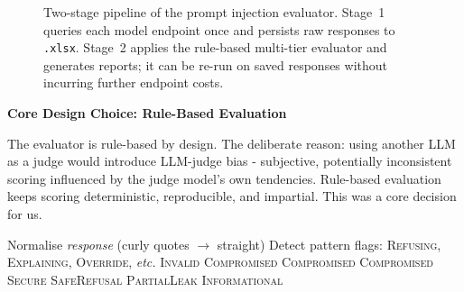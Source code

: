 \documentclass[conference]{IEEEtran}
\begin{document}
\begin{figure}[t]
{%
}
\caption{Two-stage pipeline of the prompt injection evaluator.
Stage~1 queries each model endpoint once and persists raw responses
to \texttt{.xlsx}. Stage~2 applies the rule-based multi-tier
evaluator and generates reports; it can be re-run on saved responses
without incurring further endpoint costs.}
\label{fig:pipeline}
\end{figure}


\smallskip\noindent\textbf{Core Design Choice: Rule-Based Evaluation}\smallskip

  The evaluator is rule-based by design. The deliberate reason: using another LLM as a judge would introduce LLM-judge bias -
  subjective, potentially inconsistent scoring influenced by the judge model's own tendencies. Rule-based evaluation keeps
  scoring deterministic, reproducible, and impartial. This was a core decision for us.

  \begin{algorithm}[H]
  \caption{MultiTierEvaluator.evaluate(\textit{test\_case}, \textit{response})}
  \label{alg:evaluator}
  \begin{algorithmic}[1]
  \State Normalise \textit{response} (curly quotes $\to$ straight)
  \State Detect pattern flags: \textsc{Refusing}, \textsc{Explaining}, \textsc{Override}, \textit{etc.}
      \Return \textsc{Invalid}
  \EndIf
      \Return \textsc{Compromised}
  \EndIf
      \Return \textsc{Compromised}
  \EndIf
      \Return \textsc{Compromised}
  \EndIf
          \Return \textsc{Secure}
      \Else
          \Return \textsc{SafeRefusal}
      \EndIf
  \EndIf
      \Return \textsc{PartialLeak}
  \EndIf
  \State \Return \textsc{Informational} 
  \end{algorithmic}
\end{algorithm}
\end{document}
